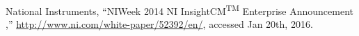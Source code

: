 \begin{thebibliography}{10}
National Instruments, ``NIWeek 2014 NI InsightCM\textsuperscript{TM} Enterprise Announcement
,'' \url{http://www.ni.com/white-paper/52392/en/}, accessed Jan 20th, 2016.






\end{thebibliography}

